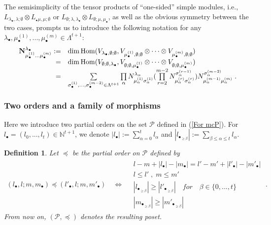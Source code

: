 \documentclass[12pt]{article}
\def\NN {{\mathbb N}}     %
\def\mc {\mathcal}
\def\tst {\Longleftrightarrow}
\newtheorem{definition}{Definition}[section]
\begin{document}
The semisimplicity of the tensor products of ``one-sided'' simple modules, i.e., $L_{\lambda_\bullet,\lambda;\emptyset}\otimes L_{{_\bullet}\mu,\mu;\emptyset}$ or $L_{\emptyset;\lambda,\lambda_\bullet}\otimes L_{\emptyset;\mu,\mu_\bullet}$, as well as the obvious symmetry between the two cases, prompts us to introduce the following notation for any $\lambda_\bullet,\mu^{(1)}_\bullet,...,\mu^{(m)}_\bullet\in\Lambda^{t+1}$:
\begin{gather}\label{For bfN many}
\begin{array}{rl}
{\bf N}^{\lambda_\bullet}_{\mu^{(1)}_\bullet...\mu^{(m)}_\bullet} :=& \dim{\rm Hom}(V_{\lambda_\bullet,\emptyset;\emptyset},V_{\mu^{(1)}_\bullet,\emptyset;\emptyset}\otimes\dots\otimes V_{\mu^{(m)}_\bullet,\emptyset;\emptyset}) \\ =& \dim{\rm Hom}(V_{\emptyset;\emptyset,\lambda_\bullet},V_{\emptyset;\emptyset,\mu^{(1)}_\bullet}\otimes\dots\otimes V_{\emptyset;\emptyset,\mu^{(m)}_\bullet}) \\ =& \sum\limits_{\sigma^{(1)}_\bullet,...,\sigma^{(m-2)}_\bullet\in\Lambda^{t+1}} \prod\limits_{\alpha} N^{\lambda_\alpha}_{\mu^{(1)}_\alpha\sigma^{(1)}_\alpha} ( \prod\limits_{r=2}^{m-2} N^{\sigma^{(r-1)}_\alpha}_{\mu^{(r)}_\alpha\sigma^{(r)}_\alpha} ) N^{\sigma^{(m-2)}_\alpha}_{\mu^{(m-1)}_\alpha\mu^{(m)}_\alpha} \;.
\end{array}
\end{gather}


\subsubsection{Two orders and a family of morphisms}

Here we introduce two partial orders on the set $\mc P$ defined in (\ref{For mcP}). For $l_\bullet=(l_0,...,l_t)\in\NN^{t+1}$, we denote $|l_\bullet|:=\sum\limits_{\alpha=0}^t l_\alpha$ and $|l_{\bullet_{\geq\beta}}|:=\sum\limits_{\beta\leq\alpha\leq t} l_\alpha$.

\begin{definition}\label{Def Poset P}
Let $\preceq$ be the partial order on $\mc P$ defined by
\begin{gather*}
(l_\bullet,l;m,m_\bullet)\preceq (l'_\bullet,l;m,m'_\bullet) \quad \tst \quad \begin{array}{|l} l-m+|l_\bullet| - |m_\bullet|=l'-m'+|l'_\bullet| - |m'_\bullet| \\ l\leq l' \;,\; m\leq m' \\ |l_{\bullet_{\geq\beta}}| \geq |l'_{\bullet_{\geq\beta}}| \quad for \quad \beta\in\{0,...,t\} \\ |m_{\bullet_{\geq\beta}}| \geq |m'_{\bullet_{\geq\beta}}|  \end{array}\;.
\end{gather*}
From now on, $(\mc P,\preceq)$ denotes the resulting poset.
\end{definition}
\end{document}
